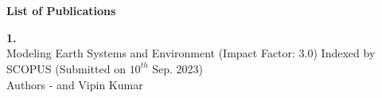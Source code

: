 
\chapter*{}
\vspace*{-3.5cm}

\vspace{11ex}
\addchaptertocentry{\listofpublication} %
    \textbf{\huge {List of Publications}}

\vspace{7ex}



\noindent\textbf{1.\ReportTitel}\\Modeling Earth Systems and Environment (Impact Factor: 3.0) Indexed by SCOPUS (Submitted on $10^{th}$ Sep. 2023)\\
Authors - \fAuthor { }and  Vipin Kumar\\




\vspace*{0.7cm}
